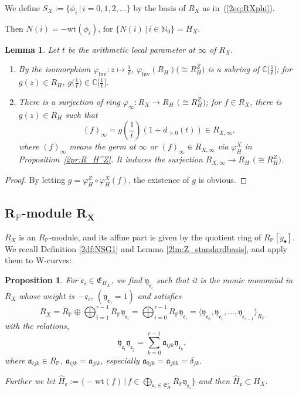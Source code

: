 \documentclass[10pt,a4paper]{amsart}
\def\CC{{\mathbb C}}
\def\NN{{\mathbb N}}
\def\PP{{\mathbb P}}
\def\fE{{\mathfrak E}}
\def\fa{{\mathfrak a}}
\def\fe{{\mathfrak e}}
\def\fy{{\mathfrak y}}
\def\hH{{\widehat H}}
\def\wt{{\mathrm {wt}}}
\numberwithin{equation}{section}
\newtheorem{Lemma}[Theorem]{Lemma}
\newtheorem{Proposition}[Theorem]{Proposition}
 { \theoremstyle{definition}
\newtheorem{Definition}[Theorem]{Definition}
\newtheorem{Note}[Theorem]{Note}
\newtheorem{Example}[Theorem]{Example}
\newtheorem{Remark}[Theorem]{Remark} }
\begin{document}
\begin{Definition}\label{2df:t_SR_N}
We define $S_X:=\{\phi_i\, |\,i = 0,1,2, \dots\}$ by the basis of $R_X$ as in~(\ref{2eq:RXphi}).
\end{Definition}

Then $N(i)=-\wt(\phi_i)$, for $\{N(i)\, |\,i \in \NN_0\}=H_X$.

\begin{Lemma}\label{2lm:varphiinf}
Let $t$ be the arithmetic local parameter at $\infty$ of $R_X$.
\begin{enumerate}\itemsep=0pt
\item[$1.$] By the isomorphism $\varphi_{\mathrm{inv}}\colon z \mapsto \frac{1}{t}$, $\varphi_{\mathrm{inv}}(R_H)\big({\cong} R_H^Z\big)$ is a subring of $\CC\big[\frac{1}{t}\big]$; for $g(z)\in R_H$, $g\big(\frac{1}{t}\big)\in \CC\big[\frac{1}{t}\big]$.

\item[$2.$] There is a surjection of ring $\varphi_\infty\colon R_{X}\to R_H$ $\big({\cong} R_H^Z\big)$; for $f\in R_X$, there is $g(z)\in R_H$ such that
\[
 (f)_\infty = g
\left(\frac{1}{t}\right)(1+d_{>0}(t)) \in R_{X,\infty},
\]
where $(f)_\infty$ means the germ at $\infty$ or $(f)_\infty \in R_{X, \infty}$ via $\varphi_H^X$ in Proposition~{\rm \ref{2pr:R_H^Z}}.
It induces the surjection $R_{X,\infty}\to R_H$ $\big({\cong} R_H^Z\big)$.
\end{enumerate}
\end{Lemma}
\begin{proof}By letting $g=\varphi_H^Z \circ\varphi_H^X(f)$, the existence of $g$ is obvious.
\end{proof}

\subsection[R\_P-module R\_X]{$\boldsymbol{R_\PP}$-module $\boldsymbol{R_X}$}\label{2ssc:R_Pmodule_R_X}

$R_X$ is an $R_\PP$-module, and its affine part is given by the quotient ring of $R_\PP[y_{\bullet}]$.
We recall Definition \ref{2df:NSG1} and Lemma \ref{2lm:Z_standardbasis}, and apply them to W-curves:

\begin{Proposition}\label{2pr:RP-moduleRX}
For $\fe_i \in \fE_{H_X}$, we find $\fy_{\fe_i}$ such that it is the monic monomial in $R_X$ whose weight is~$-\fe_i$, $(\fy_{\fe_0}=1)$ and satisfies
\[
R_X = R_\PP \oplus \bigoplus_{i=1}^{r-1} R_\PP \fy_{\fe_i}
=\bigoplus_{i=0}^{r-1} R_\PP \fy_{\fe_i}
=\langle \fy_{\fe_0}, \fy_{\fe_1}, \dots, \fy_{\fe_{r-1}}\rangle_{R_\PP}
\]
with the relations,
\begin{equation}
\fy_{\fe_i} \fy_{\fe_j} =\sum_{k=0}^{r-1} \fa_{i j k} \fy_{\fe_k},
\label{2eq:fyfy=fy}
\end{equation}
where $\fa_{i j k} \in R_\PP$, $\fa_{i j k}=\fa_{j i k}$, especially $\fa_{0j k}=\fa_{j0k}=\delta_{j k}$.

Further we let $\hH_{\fe}:=\big\{{-}\wt(f)\, | \, f \in \bigoplus_{\fe_i \in \fE_H^\times} R_\PP \fy_{\fe_i}\big\}$ and then $\hH_{\fe}\subset H_X$.
\end{Proposition}
\end{document}
